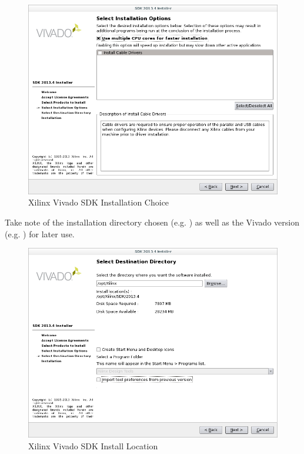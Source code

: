 \begin{flushleft}
\begin{flushleft}
\begin{enumerate}
\begin{figure}[H]
	\centerline{\includegraphics[scale=0.4]{figures/xilinx_vivado_sdk_choose_installation}}
	\caption{Xilinx Vivado SDK Installation Choice}
\end{figure}
\pagebreak
Take note of the installation directory chosen (e.g. ) as well as the Vivado version (e.g. ) for later use.
\begin{figure}[H]
	\centerline{\includegraphics[scale=0.4]{figures/xilinx_vivado_sdk_install_location}}
	\caption{Xilinx Vivado SDK Install Location}
\end{figure}
\end{enumerate}
\end{flushleft}


\end{flushleft}
